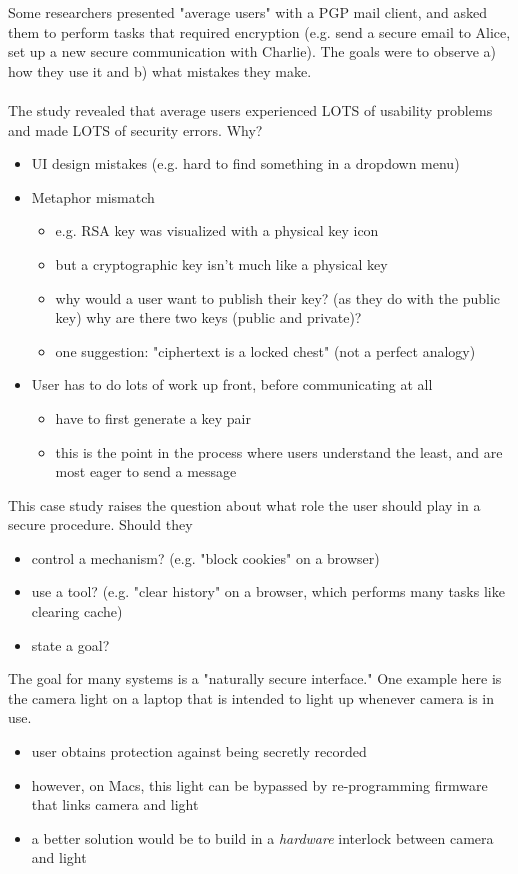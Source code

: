 Some researchers presented "average users" with a PGP mail client, and asked them to perform tasks that required encryption (e.g. send a secure email to Alice, set up a new secure communication with Charlie). The goals were to observe a) how they use it and b) what mistakes they make. 
\\
\\
The study revealed that average users experienced LOTS of usability problems and made LOTS of security errors. 
Why?
\begin{itemize}
	\item UI design mistakes (e.g. hard to find something in a dropdown menu)
	\item Metaphor mismatch
		\begin{itemize}
			\item e.g. RSA key was visualized with a physical key icon
			\item but a cryptographic key isn't much like a physical key
			\item why would a user want to publish their key? (as they do with the public key) why are there two keys (public and private)?
			\item one suggestion: "ciphertext is a locked chest" (not a perfect analogy)
		\end{itemize}
	\item User has to do lots of work up front, before communicating at all
		\begin{itemize}
			\item have to first generate a key pair
			\item this is the point in the process where users understand the least, and are most eager to send a message
		\end{itemize}
\end{itemize}

This case study raises the question about what role the user should play in a secure procedure. Should they
	\begin{itemize}
		\item control a mechanism? (e.g. "block cookies" on a browser)
		\item use a tool? (e.g. "clear history" on a browser, which performs many tasks like clearing cache)
		\item state a goal?
	\end{itemize}
	
The goal for many systems is a "naturally secure interface." One example here is the camera light on a laptop that is intended to light up whenever camera is in use.
	\begin{itemize}
		\item user obtains protection against being secretly recorded
		\item however, on Macs, this light can be bypassed by re-programming firmware that links camera and light
		\item a better solution would be to build in a \emph{hardware} interlock between camera and light
	\end{itemize}

